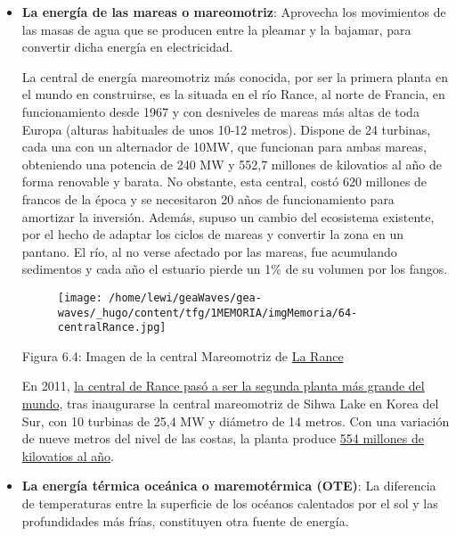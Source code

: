 \documentclass[]{article}
\begin{document}
\begin{itemize}
\item
  \textbf{La energía de las mareas o mareomotriz}: Aprovecha los
  movimientos de las masas de agua que se producen entre la pleamar y la
  bajamar, para convertir dicha energía en electricidad.

  La central de energía mareomotriz más conocida, por ser la primera
  planta en el mundo en construirse, es la situada en el río Rance, al
  norte de Francia, en funcionamiento desde 1967 y con desniveles de
  mareas más altas de toda Europa (alturas habituales de unos 10-12
  metros). Dispone de 24 turbinas, cada una con un alternador de 10MW,
  que funcionan para ambas mareas, obteniendo una potencia de 240 MW y
  552,7 millones de kilovatios al año de forma renovable y barata. No
  obstante, esta central, costó 620 millones de francos de la época y se
  necesitaron 20 años de funcionamiento para amortizar la inversión.
  Además, supuso un cambio del ecosistema existente, por el hecho de
  adaptar los ciclos de mareas y convertir la zona en un pantano. El
  río, al no verse afectado por las mareas, fue acumulando sedimentos y
  cada año el estuario pierde un 1\% de su volumen por los fangos.

  \begin{figure}
  \centering
  \texttt{[image: /home/lewi/geaWaves/gea-waves/\_hugo/content/tfg/1MEMORIA/imgMemoria/64-centralRance.jpg]}
  \caption{}
  \end{figure}

  Figura 6.4: Imagen de la central Mareomotriz de
  \href{http://ireneu.blogspot.com.es/2014/07/la-ecologica-y-desastrosa-central.html}{La
  Rance}

  En 2011,
  \href{https://www.blogenergiasostenible.com/central-energia-mareomotriz-rance-mas-grande-mundo/}{la
  central de Rance pasó a ser la segunda planta más grande del mundo},
  tras inaugurarse la central mareomotriz de Sihwa Lake en Korea del
  Sur, con 10 turbinas de 25,4 MW y diámetro de 14 metros. Con una
  variación de nueve metros del nivel de las costas, la planta produce
  \href{http://world.kbs.co.kr/spanish/archive/program/news_issue.htm?no=22473}{554
  millones de kilovatios al año}. 
\item
  \textbf{La energía térmica oceánica o maremotérmica (OTE)}: La
  diferencia de temperaturas entre la superficie de los océanos
  calentados por el sol y las profundidades más frías, constituyen otra
  fuente de energía.


\end{itemize}
\end{document}
